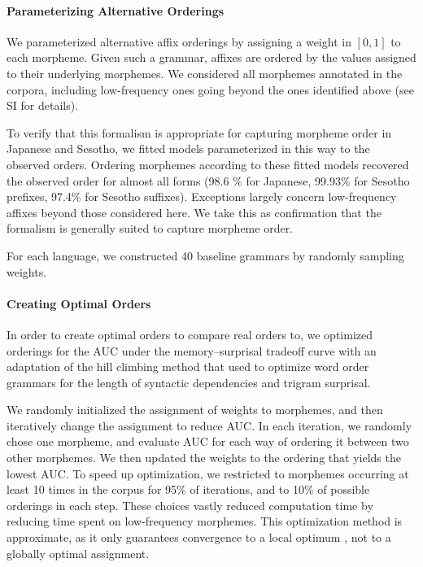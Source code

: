 \paragraph{Parameterizing Alternative Orderings}

We parameterized alternative affix orderings by assigning a weight in $[0,1]$ to each morpheme.
Given such a grammar, affixes are ordered by the values assigned to their underlying morphemes.
We considered all morphemes annotated in the corpora, including low-frequency ones going beyond the ones identified above (see SI for details).

To verify that this formalism is appropriate for capturing morpheme order in Japanese and Sesotho, we fitted models parameterized in this way to the observed orders.
Ordering morphemes according to these fitted models recovered the observed order for almost all forms (98.6 \% for Japanese, 99.93\% for Sesotho prefixes, 97.4\% for Sesotho suffixes). Exceptions largely concern low-frequency affixes beyond those considered here. We take this as confirmation that the formalism is generally suited to capture morpheme order.

For each language, we constructed 40 baseline grammars by randomly sampling weights.

\paragraph{Creating Optimal Orders}

In order to create optimal orders to compare real orders to, we optimized orderings for the AUC under the memory--surprisal tradeoff curve with an adaptation of the hill climbing method that \citet{gildea-human-2015} used to optimize word order grammars for the length of syntactic dependencies and trigram surprisal.

We randomly initialized the assignment of weights to morphemes, and then iteratively change the assignment to reduce AUC.
In each iteration, we randomly chose one morpheme, and evaluate AUC for each way of ordering it between two other morphemes.
We then updated the weights to the ordering that yields the lowest AUC.
To speed up optimization, we restricted to morphemes occurring at least 10 times in the corpus for 95\% of iterations, and to 10\% of possible orderings in each step.
These choices vastly reduced computation time by reducing time spent on low-frequency morphemes.
This optimization method is approximate, as it only guarantees convergence to a local optimum \citep{gildea-human-2015}, not to a globally optimal assignment.

